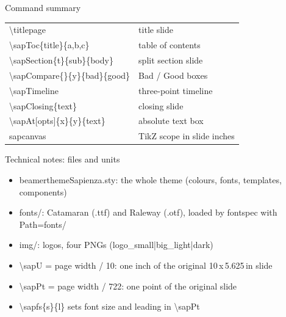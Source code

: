 \documentclass[t,aspectratio=169]{beamer}
\newcommand{\code}[1]{{\ttfamily\small #1}}
\begin{document}
\begin{frame}{Command summary}
  \small
  \begin{tabular}{@{}ll@{}}
    \code{\textbackslash titlepage} & title slide\\
    \code{\textbackslash sapToc\{title\}\{a,b,c\}} & table of contents\\
    \code{\textbackslash sapSection\{t\}\{sub\}\{body\}} & split section slide\\
    \code{\textbackslash sapCompare\{\}\{y\}\{bad\}\{good\}} & Bad / Good boxes\\
    \code{\textbackslash sapTimeline} & three-point timeline\\
    \code{\textbackslash sapClosing\{text\}} & closing slide\\
    \code{\textbackslash sapAt[opts]\{x\}\{y\}\{text\}} & absolute text box\\
    \code{sapcanvas} & TikZ scope in slide inches\\
  \end{tabular}
\end{frame}

\begin{frame}{Technical notes: files and units}
  \small
  \begin{itemize}
    \item \code{beamerthemeSapienza.sty}: the whole theme (colours, fonts, templates, components)
    \item \code{fonts/}: Catamaran (\code{.ttf}) and Raleway (\code{.otf}), loaded by \code{fontspec} with \code{Path=fonts/}
    \item \code{img/}: logos, four PNGs (\code{logo\_small|big\_light|dark})
    \item \code{\textbackslash sapU} = page width / 10: one inch of the original 10\,x\,5.625\,in slide
    \item \code{\textbackslash sapPt} = page width / 722: one point of the original slide
    \item \code{\textbackslash sapfs\{s\}\{l\}} sets font size and leading in \code{\textbackslash sapPt}
  \end{itemize}
\end{frame}
\end{document}

